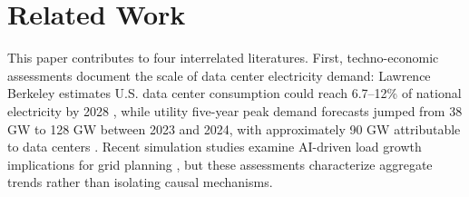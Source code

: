 \documentclass[sigconf,authordraft]{acmart}
\newcommand{\aruna}[1]{\textcolor{blue}{Aruna[#1]}}
\begin{document}

\section{Related Work}

This paper contributes to four interrelated literatures. First, techno-economic assessments document the scale of data center electricity demand: Lawrence Berkeley estimates U.S. data center consumption could reach 6.7--12\% of national electricity by 2028 \cite{shehabi2024}, while utility five-year peak demand forecasts jumped from 38 GW to 128 GW between 2023 and 2024, with approximately 90 GW attributable to data centers \cite{gridstrategies2025}. Recent simulation studies examine AI-driven load growth implications for grid planning \cite{lin2024exploding, chien2023adapting}, but these assessments characterize aggregate trends rather than isolating causal mechanisms.
\end{document}

